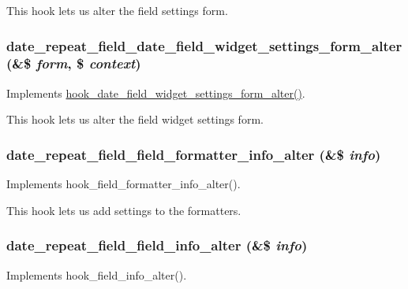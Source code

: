 This hook lets us alter the field settings form. \hypertarget{date__repeat__field_8module_a87cc72264b877be64aac471b62e09eb3}{
\subsubsection[{date\_\-repeat\_\-field\_\-date\_\-field\_\-widget\_\-settings\_\-form\_\-alter}]{\setlength{\rightskip}{0pt plus 5cm}date\_\-repeat\_\-field\_\-date\_\-field\_\-widget\_\-settings\_\-form\_\-alter (\&\$ {\em form}, \/  \$ {\em context})}}
\label{date__repeat__field_8module_a87cc72264b877be64aac471b62e09eb3}
Implements \hyperlink{date_8api_8php_a0c2475c846f8750a83b95ea852bf42cf}{hook\_\-date\_\-field\_\-widget\_\-settings\_\-form\_\-alter()}.

This hook lets us alter the field widget settings form. \hypertarget{date__repeat__field_8module_a38a52391b8d04182e8525017a79b6c5e}{
\subsubsection[{date\_\-repeat\_\-field\_\-field\_\-formatter\_\-info\_\-alter}]{\setlength{\rightskip}{0pt plus 5cm}date\_\-repeat\_\-field\_\-field\_\-formatter\_\-info\_\-alter (\&\$ {\em info})}}
\label{date__repeat__field_8module_a38a52391b8d04182e8525017a79b6c5e}
Implements hook\_\-field\_\-formatter\_\-info\_\-alter().

This hook lets us add settings to the formatters. \hypertarget{date__repeat__field_8module_ad5c963b8f4121e98d8f418fa7d0ae567}{
\subsubsection[{date\_\-repeat\_\-field\_\-field\_\-info\_\-alter}]{\setlength{\rightskip}{0pt plus 5cm}date\_\-repeat\_\-field\_\-field\_\-info\_\-alter (\&\$ {\em info})}}
\label{date__repeat__field_8module_ad5c963b8f4121e98d8f418fa7d0ae567}
Implements hook\_\-field\_\-info\_\-alter().


